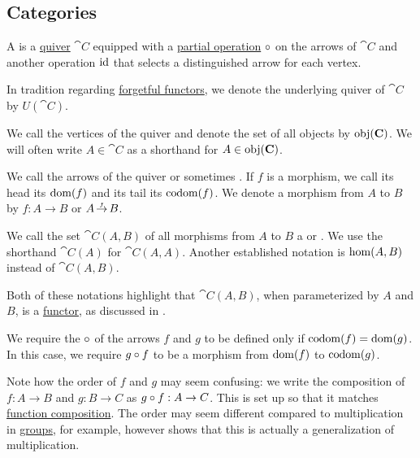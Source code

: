 \subsection{Categories}\label{subsec:categories}

\begin{definition}\label{def:category}
  A  is a \hyperref[def:quiver]{quiver} \( \cat{C} \) equipped with a \hyperref[def:partial_function]{partial operation} \( \bincirc \) on the arrows of \( \cat{C} \) and another operation \( \operatorname{id} \) that selects a distinguished arrow for each vertex.

  In tradition regarding \hyperref[def:concrete_category]{forgetful functors}, we denote the underlying quiver of \( \cat{C} \) by \( U(\cat{C}) \).

  \begin{thmenum}[series=def:category]
     We call the vertices of the quiver  and denote the set of all objects by \( \operatorname{obj}(\operatorname{\mathbf{C}}) \). We will often write \( A \in \cat{C} \) as a shorthand for \( A \in \operatorname{obj}(\operatorname{\mathbf{C}}) \).

     We call the arrows of the quiver  or sometimes . If \( f \) is a morphism, we call its head its  \( \operatorname{dom}(f) \) and its tail its  \( \operatorname*{co\negthinspace\operatorname{dom}}(f) \). We denote a morphism from \( A \) to \( B \) by \( f: A \to B \) or \( A \reloset f \to B \).

    We call the set \( \cat{C}(A, B) \) of all morphisms from \( A \) to \( B \) a  or . We use the shorthand \( \cat{C}(A) \) for \( \cat{C}(A, A) \). Another established notation is \( \operatorname{hom}(A, B) \) instead of \( \cat{C}(A, B) \).

    Both of these notations highlight that \( \cat{C}(A, B) \), when parameterized by \( A \) and \( B \), is a \hyperref[def:functor]{functor}, as discussed in .

     We require the  \( \bincirc \) of the arrows \( f \) and \( g \) to be defined only if \( \operatorname*{co\negthinspace\operatorname{dom}}(f) = \operatorname{dom}(g) \). In this case, we require \( g \bincirc f \) to be a morphism from \( \operatorname{dom}(f) \) to \( \operatorname*{co\negthinspace\operatorname{dom}}(g) \).

    Note how the order of \( f \) and \( g \) may seem confusing: we write the composition of \( f: A \to B \) and \( g: B \to C \) as \( g \bincirc f: A \to C \). This is set up so that it matches \hyperref[def:multi_valued_function/composition]{function composition}. The order may seem different compared to multiplication in \hyperref[def:group]{groups}, for example, however  shows that this is actually a generalization of multiplication.


\end{thmenum}
\end{definition}
